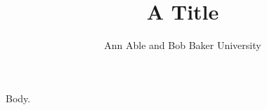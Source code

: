 \documentclass{article}
\begin{document}
\title{A Title}
\author{Ann Able and Bob Baker University}
\maketitle
Body.
\end{document}
